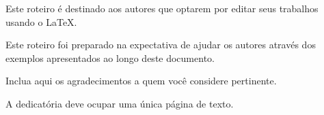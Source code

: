 \noindent%
Este roteiro é destinado aos autores que optarem por editar seus trabalhos usando o \LaTeX .

\noindent%
Este roteiro foi preparado na expectativa de ajudar os autores através dos exemplos apresentados ao longo deste documento.

\noindent%
Inclua aqui os agradecimentos a quem você considere pertinente.

\noindent%
A dedicatória deve ocupar uma única página de texto.
\vfill